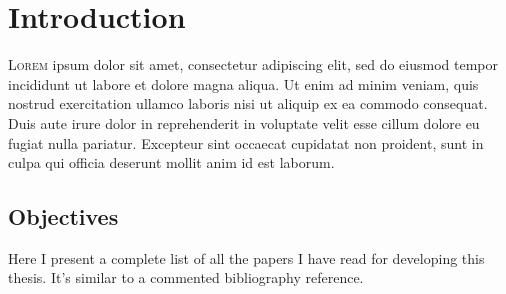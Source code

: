 

\chapter{Introduction}



\lettrine{L}{orem} ipsum dolor sit amet, consectetur
adipiscing elit, sed do eiusmod tempor incididunt ut labore et dolore magna
aliqua. Ut enim ad minim veniam, quis nostrud exercitation ullamco laboris nisi
ut aliquip ex ea commodo consequat. Duis aute irure dolor in reprehenderit in
voluptate velit esse cillum dolore eu fugiat nulla pariatur. Excepteur sint
occaecat cupidatat non proident, sunt in culpa qui officia deserunt mollit anim
id est laborum.


\section{Objectives}


Here I present a complete list of all the papers I have read for developing this
thesis. It's similar to a commented bibliography reference.
